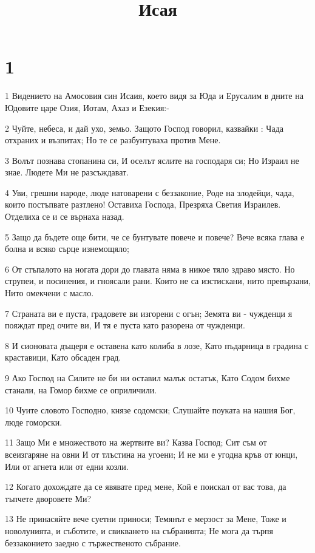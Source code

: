 

\title{Исая}


\chapter{1}

\par 1 Видението на Амосовия син Исаия, което видя за Юда и Ерусалим в дните на Юдовите царе Озия, Иотам, Ахаз и Езекия:-
\par 2 Чуйте, небеса, и дай ухо, земьо. Защото Господ говорил, казвайки : Чада отхраних и възпитах; Но те се разбунтуваха против Мене.
\par 3 Волът познава стопанина си, И оселът яслите на господаря си; Но Израил не знае. Людете Ми не разсъждават.
\par 4 Уви, грешни народе, люде натоварени с беззаконие, Роде на злодейци, чада, които постъпвате разтлено! Оставиха Господа, Презряха Светия Израилев. Отделиха се и се върнаха назад.
\par 5 Защо да бъдете още бити, че се бунтувате повече и повече? Вече всяка глава е болна и всяко сърце изнемощяло;
\par 6 От стъпалото на ногата дори до главата няма в никое тяло здраво място. Но струпеи, и посинения, и гноясали рани. Които не са изстискани, нито превързани, Нито омекчени с масло.
\par 7 Страната ви е пуста, градовете ви изгорени с огън; Земята ви - чужденци я пояждат пред очите ви, И тя е пуста като разорена от чужденци.
\par 8 И сионовата дъщеря е оставена като колиба в лозе, Като пъдарница в градина с краставици, Като обсаден град.
\par 9 Ако Господ на Силите не би ни оставил малък остатък, Като Содом бихме станали, на Гомор бихме се оприличили.
\par 10 Чуите словото Господно, князе содомски; Слушайте поуката на нашия Бог, люде гоморски.
\par 11 Защо Ми е множеството на жертвите ви? Казва Господ; Сит съм от всеизгаряне на овни И от тлъстина на угоени; И не ми е угодна кръв от юнци, Или от агнета или от едни козли.
\par 12 Когато дохождате да се явявате пред мене, Кой е поискал от вас това, да тъпчете дворовете Ми?
\par 13 Не принасяйте вече суетни приноси; Темянът е мерзост за Мене, Тоже и новолунията, и съботите, и свикването на събранията; Не мога да търпя беззаконието заедно с тържественото събрание.
